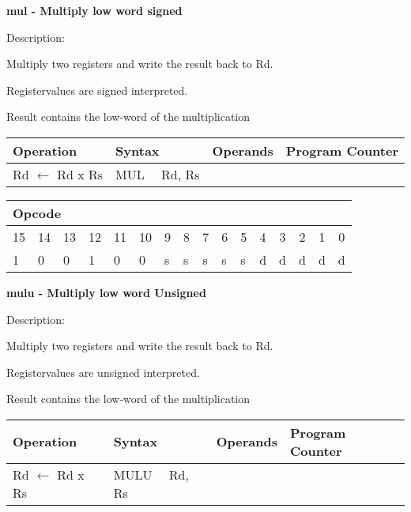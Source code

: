 \documentclass{article}
\begin{document}
\bigskip

\textbf{mul - Multiply low word signed}

Description:

Multiply two registers and write the result back to Rd.

Registervalues are signed interpreted.

Result contains the low-word of the multiplication

\begin{tabular}{|l|l|l|l|}
\hline
Operation & Syntax & Operands & Program Counter \\ \hline
Rd $\leftarrow $ Rd x Rs & MUL \ \ Rd, Rs &  &  \\ \hline
\end{tabular}

\begin{tabular}{|c|c|c|c|c|c|c|c|c|c|c|c|c|c|c|c|}
\hline
\multicolumn{6}{|l|}{Opcode} & \multicolumn{5}{|l|}{} & \multicolumn{5}{|l|}{
} \\ \hline
15 & 14 & 13 & 12 & 11 & 10 & 9 & 8 & 7 & 6 & 5 & 4 & 3 & 2 & 1 & 0 \\ \hline
\multicolumn{1}{|l|}{1} & \multicolumn{1}{|l|}{0} & \multicolumn{1}{|l|}{0}
& \multicolumn{1}{|l|}{1} & \multicolumn{1}{|l|}{0} & \multicolumn{1}{|l|}{0}
& \multicolumn{1}{|l|}{s} & \multicolumn{1}{|l|}{s} & \multicolumn{1}{|l|}{s}
& \multicolumn{1}{|l|}{s} & \multicolumn{1}{|l|}{s} & \multicolumn{1}{|l|}{d}
& \multicolumn{1}{|l|}{d} & \multicolumn{1}{|l|}{d} & \multicolumn{1}{|l|}{d}
& \multicolumn{1}{|l|}{d} \\ \hline
\end{tabular}

\bigskip

\textbf{mulu - Multiply low word Unsigned}

Description:

Multiply two registers and write the result back to Rd.

Registervalues are unsigned interpreted.

Result contains the low-word of the multiplication

\begin{tabular}{|l|l|l|l|}
\hline
Operation & Syntax & Operands & Program Counter \\ \hline
Rd $\leftarrow $ Rd x Rs & MULU \ \ Rd, Rs &  &  \\ \hline
\end{tabular}
\end{document}
